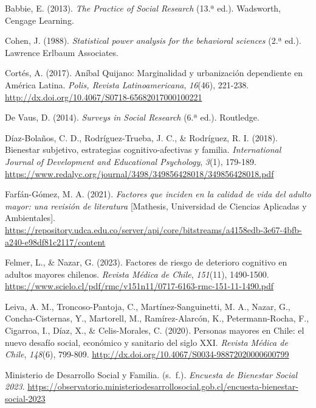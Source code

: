 \documentclass[
  spanish,
  a4paper,
  oneside]{scrbook}
\newlength{\cslhangindent}
\newenvironment{CSLReferences}[2] %
 {\begin{list}{}{%
  \setlength{\itemindent}{0pt}
  \setlength{\leftmargin}{0pt}
  \setlength{\parsep}{0pt}
  \ifodd #1
   \setlength{\leftmargin}{\cslhangindent}
   \setlength{\itemindent}{-1\cslhangindent}
  \fi
  \setlength{\itemsep}{#2\baselineskip}}}
 {\end{list}}
\begin{document}
\protect{}\label{refs}
\begin{CSLReferences}{1}{0}
Babbie, E. (2013). \emph{The Practice of Social Research} (13.ª ed.).
Wadsworth, Cengage Learning.

Cohen, J. (1988). \emph{Statistical power analysis for the behavioral
sciences} (2.ª ed.). Lawrence Erlbaum Associates.

Cortés, A. (2017). An{í}bal Quijano: Marginalidad y urbanizaci{ó}n
dependiente en Am{é}rica Latina. \emph{Polis, Revista Latinoamericana},
\emph{16}(46), 221-238.
\url{http://dx.doi.org/10.4067/S0718-65682017000100221}

De Vaus, D. (2014). \emph{Surveys in Social Research} (6.ª ed.).
Routledge.

Díaz-Bolaños, C. D., Rodríguez-Trueba, J. C., \& Rodríguez, R. I.
(2018). Bienestar subjetivo, estrategias cognitivo-afectivas y familia.
\emph{International Journal of Development and Educational Psychology},
\emph{3}(1), 179-189.
\url{https://www.redalyc.org/journal/3498/349856428018/349856428018.pdf}

Farfán-Gómez, M. A. (2021). \emph{Factores que inciden en la calidad de
vida del adulto mayor: una revisi{ó}n de literatura} {[}Mathesis,
Universidad de Ciencias Aplicadas y Ambientales{]}.
\url{https://repository.udca.edu.co/server/api/core/bitstreams/a4158edb-3e67-4bfb-a240-e98df81c2117/content}

Felmer, L., \& Nazar, G. (2023). Factores de riesgo de deterioro
cognitivo en adultos mayores chilenos. \emph{Revista M{é}dica de Chile},
\emph{151}(11), 1490-1500.
\url{https://www.scielo.cl/pdf/rmc/v151n11/0717-6163-rmc-151-11-1490.pdf}

Leiva, A. M., Troncoso-Pantoja, C., Martínez-Sanguinetti, M. A., Nazar,
G., Concha-Cisternas, Y., Martorell, M., Ramírez-Alarcón, K.,
Petermann-Rocha, F., Cigarroa, I., Díaz, X., \& Celis-Morales, C.
(2020). Personas mayores en Chile: el nuevo desaf{í}o social,
econ{ó}mico y sanitario del siglo XXI. \emph{Revista M{é}dica de Chile},
\emph{148}(6), 799-809.
\url{http://dx.doi.org/10.4067/S0034-98872020000600799}

Ministerio de Desarrollo Social y Familia. (s.~f.). \emph{Encuesta de
Bienestar Social 2023}.
\url{https://observatorio.ministeriodesarrollosocial.gob.cl/encuesta-bienestar-social-2023}


\end{CSLReferences}
\end{document}
